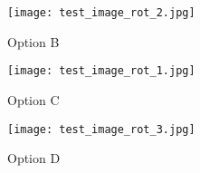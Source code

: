 \documentclass{ximera}
\begin{document}
\begin{exercise}
      \begin{figure}[h]
        \centering
        \texttt{[image: test\_image\_rot\_2.jpg]}
        \caption{Option B}
        \label{fig:optionA}
    \end{figure}

    \begin{figure}[h]
      \centering
      \texttt{[image: test\_image\_rot\_1.jpg]}
      \caption{Option C}
      \label{fig:optionA}
  \end{figure}

  \begin{figure}[h]
    \centering
    \texttt{[image: test\_image\_rot\_3.jpg]}
    \caption{Option D}
    \label{fig:optionA}
\end{figure}
  
  
  \end{exercise}
\end{document}
